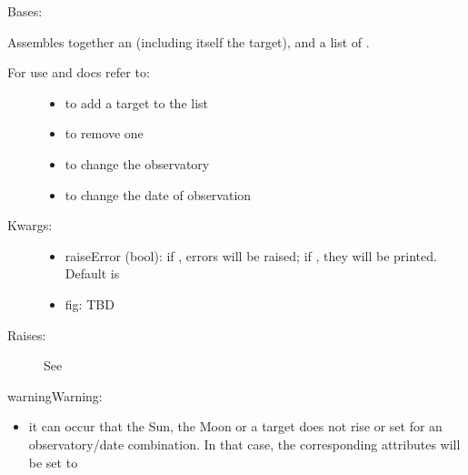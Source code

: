 \documentclass[letterpaper,10pt,english]{sphinxmanual}
\begin{document}

\begin{fulllineitems}
\label{astroobs:astroobs.Observation}
Bases: 

Assembles together an  (including itself the  target), and a list of .
\begin{description}
\item[{For use and docs refer to:}] \leavevmode\begin{itemize}
\item {} 
 to add a target to the list

\item {} 
 to remove one

\item {} 
 to change the observatory

\item {} 
 to change the date of observation

\end{itemize}

\item[{Kwargs:}] \leavevmode\begin{itemize}
\item {} 
raiseError (bool): if , errors will be raised; if , they will be printed. Default is 

\item {} 
fig: TBD

\end{itemize}

\item[{Raises:}] \leavevmode
See 

\end{description}

\begin{notice}{warning}{Warning:}\begin{itemize}
\item {} 
it can occur that the Sun, the Moon or a target does not rise or set for an observatory/date combination. In that case, the corresponding attributes will be set to 


\end{itemize}
\end{notice}
\end{fulllineitems}
\end{document}
